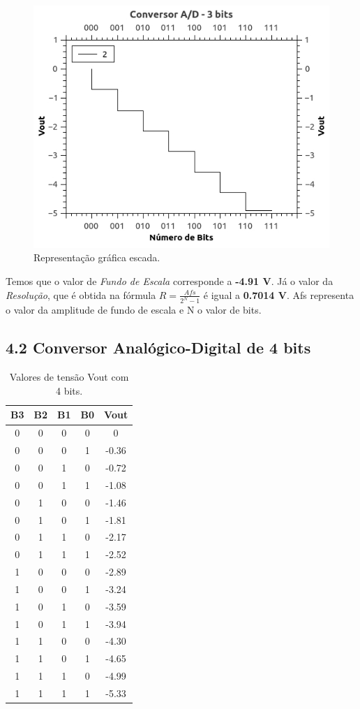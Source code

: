 \documentclass[12pt]{article}
\begin{document}
\begin{figure}[H]
\centering
\includegraphics[width=.5\textwidth]{grafico3bit.jpeg}
\caption{Representação gráfica escada.}
\label{fig:3bit}
\end{figure}

Temos que o valor de \textit{Fundo de Escala} corresponde a \textbf{-4.91 V}. Já o valor da \textit{Resolução}, que é obtida na fórmula $R = \frac{Afs}{2^N-1}$ é igual a \textbf{0.7014 V}. Afs representa o valor da amplitude de fundo de escala e N o valor de bits.


\subsection{4.2 Conversor Analógico-Digital de 4 bits}
\label{sec:CAD4}


\begin{table}[H]
    \centering
    \caption{Valores de tensão Vout com 4 bits.}
    \begin{tabular}{|c|c|c|c|c|}
    \cline{1-5}
    \multicolumn{1}{|c|}{B3} & \multicolumn{1}{|c|}{B2} & \multicolumn{1}{|c|}{B1} & \multicolumn{1}{|c|}{B0} & \multicolumn{1}{|c|}{Vout} \\
    \hline
    0 & 0 & 0 & 0 & 0 \\
    0 & 0 & 0 & 1 & -0.36 \\
    0 & 0 & 1 & 0 & -0.72 \\
    0 & 0 & 1 & 1 & -1.08  \\
    0 & 1 & 0 & 0 & -1.46  \\
    0 & 1 & 0 & 1 & -1.81  \\
    0 & 1 & 1 & 0 & -2.17  \\
    0 & 1 & 1 & 1 & -2.52  \\
    1 & 0 & 0 & 0 & -2.89 \\
    1 & 0 & 0 & 1 & -3.24 \\
    1 & 0 & 1 & 0 & -3.59 \\
    1 & 0 & 1 & 1 & -3.94  \\
    1 & 1 & 0 & 0 & -4.30  \\
    1 & 1 & 0 & 1 & -4.65  \\
    1 & 1 & 1 & 0 & -4.99  \\
    1 & 1 & 1 & 1 & -5.33  \\
    \hline
    \end{tabular}
    \label{tab:resultado4bit}
\end{table}
\end{document}
